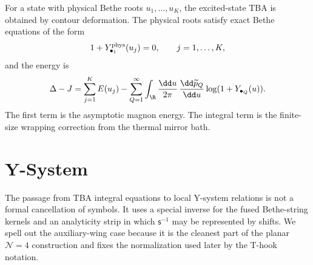 For a state with physical Bethe roots \(u_1,\ldots,u_K\), the excited-state
TBA is obtained by contour deformation.  The physical roots satisfy exact
Bethe equations of the form
\[
  1+Y_{\bullet_1}^{\rm phys}(u_j)=0,
  \qquad j=1,\ldots,K,
\]
and the energy is
\begin{equation}
  \Delta-J
  =
  \sum_{j=1}^K E(u_j)
  -
  \sum_{Q=1}^\infty
  \int_{\R}\frac{\dd u}{2\pi}\,
  \frac{\dd\widetilde p_Q}{\dd u}
  \log(1+Y_{\bullet_Q}(u)).
  \label{eq:planar-n4-excited-tba-energy}
\end{equation}
The first term is the asymptotic magnon energy.  The integral term is the
finite-size wrapping correction from the thermal mirror bath.

\section{Y-System}

The passage from TBA integral equations to local Y-system relations is not a
formal cancellation of symbols.  It uses a special inverse for the fused
Bethe-string kernels and an analyticity strip in which
\(\mathsf s^{-1}\) may be represented by shifts.  We spell out the
auxiliary-wing case because it is the cleanest part of the planar
\(\mathcal N=4\) construction and fixes the normalization used later by the
T-hook notation.

